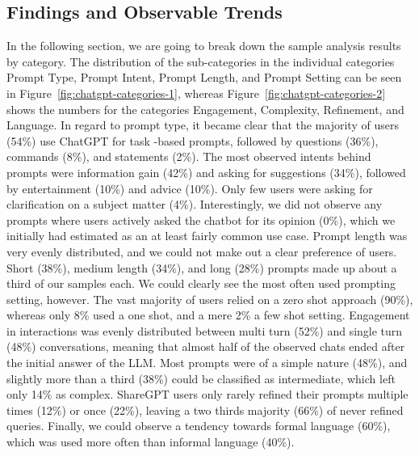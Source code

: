 \subsection{Findings and Observable Trends}
\label{subsec:findings-and-observable-trends}
In the following section, we are going to break down the sample analysis results by category.
The distribution of the sub-categories in the individual categories Prompt Type, Prompt
Intent, Prompt Length, and Prompt Setting can be seen in Figure~\ref{fig:chatgpt-categories-1},
whereas Figure~\ref{fig:chatgpt-categories-2} shows the numbers for the categories Engagement,
Complexity, Refinement, and Language.
In regard to prompt type, it became clear that the majority of users (54\%) use ChatGPT for task -based prompts, followed by questions (36\%), commands (8\%), and statements (2\%).
The most observed intents behind prompts were information gain (42\%) and asking for suggestions (34\%), followed by entertainment (10\%) and advice (10\%).
Only few users were asking for clarification on a subject matter (4\%).
Interestingly, we did not observe any prompts where users actively asked the chatbot for its
opinion (0\%), which we initially had estimated as an at least fairly common use case.
Prompt length was very evenly distributed, and we could not make out a clear preference of users.
Short (38\%), medium length (34\%), and long (28\%) prompts made up about a third of our samples
each.
We could clearly see the most often used prompting setting, however.
The vast majority of users relied on a zero shot approach (90\%), whereas only 8\% used a one shot,
and a mere 2\% a few shot setting.
Engagement in interactions was evenly distributed between multi turn (52\%) and single turn (48\%)
conversations, meaning that almost half of the observed chats ended after the initial answer of
the LLM\@.
Most prompts were of a simple nature (48\%), and slightly more than a third (38\%) could be
classified as intermediate, which left only 14\% as complex.
ShareGPT users only rarely refined their prompts multiple times (12\%) or once (22\%),
leaving a two thirds majority (66\%) of never refined queries.
Finally, we could observe a tendency towards formal language (60\%), which was used more often
than informal language (40\%).

